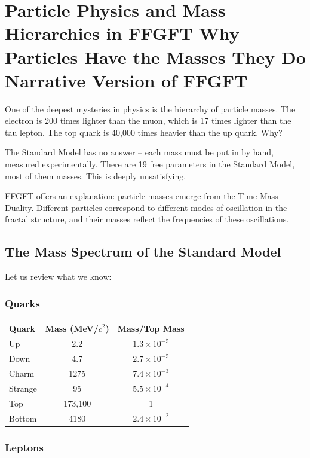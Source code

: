 \chapter{Particle Physics and Mass Hierarchies in FFGFT  Why Particles Have the Masses They Do  Narrative Version of FFGFT}



One of the deepest mysteries in physics is the hierarchy of particle masses. The electron is 200 times lighter than the muon, which is 17 times lighter than the tau lepton. The top quark is 40,000 times heavier than the up quark. Why?

The Standard Model has no answer -- each mass must be put in by hand, measured experimentally. There are 19 free parameters in the Standard Model, most of them masses. This is deeply unsatisfying.

FFGFT offers an explanation: particle masses emerge from the Time-Mass Duality. Different particles correspond to different modes of oscillation in the fractal structure, and their masses reflect the frequencies of these oscillations.

\section{The Mass Spectrum of the Standard Model}

Let us review what we know:

\subsection{Quarks}

\begin{tabular}{lcc}
\hline
Quark & Mass (MeV/$c^2$) & Mass/Top Mass \\
\hline
Up & 2.2 & $1.3 \times 10^{-5}$ \\
Down & 4.7 & $2.7 \times 10^{-5}$ \\
Charm & 1275 & $7.4 \times 10^{-3}$ \\
Strange & 95 & $5.5 \times 10^{-4}$ \\
Top & 173,100 & 1 \\
Bottom & 4180 & $2.4 \times 10^{-2}$ \\
\hline
\end{tabular}

\subsection{Leptons}

